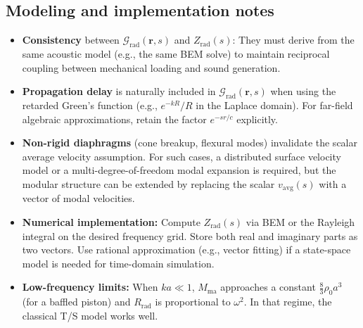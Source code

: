 \subsection{Modeling and implementation notes}

\begin{itemize}
  \item \textbf{Consistency} between \(\mathcal{G}_{\mathrm{rad}}(\mathbf{r},s)\) and \(Z_{\mathrm{rad}}(s)\): They must derive from the same acoustic model (e.g., the same BEM solve) to maintain reciprocal coupling between mechanical loading and sound generation.
  \item \textbf{Propagation delay} is naturally included in \(\mathcal{G}_{\mathrm{rad}}(\mathbf{r},s)\) when using the retarded Green's function (e.g., \(e^{-kR}/R\) in the Laplace domain). For far-field algebraic approximations, retain the factor \(e^{-sr/c}\) explicitly.
  \item \textbf{Non-rigid diaphragms} (cone breakup, flexural modes) invalidate the scalar average velocity assumption. For such cases, a distributed surface velocity model or a multi-degree-of-freedom modal expansion is required, but the modular structure can be extended by replacing the scalar \(v_{\mathrm{avg}}(s)\) with a vector of modal velocities.
  \item \textbf{Numerical implementation:} Compute \(Z_{\mathrm{rad}}(s)\) via BEM or the Rayleigh integral on the desired frequency grid. Store both real and imaginary parts as two vectors. Use rational approximation (e.g., vector fitting) if a state-space model is needed for time-domain simulation.
  \item \textbf{Low-frequency limits:} When \(ka\ll1\), \(M_{\mathrm{ma}}\) approaches a constant \(\frac{8}{3}\rho_0 a^3\) (for a baffled piston) and \(R_{\mathrm{rad}}\) is proportional to \(\omega^2\). In that regime, the classical T/S model works well.
\end{itemize}

